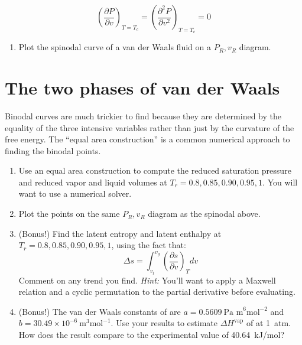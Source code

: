 \documentclass[11pt]{article}
\begin{document}
\begin{equation*}
  \left ( \frac{\partial P}{\partial v} \right )_{T=T_c} = \left (
    \frac{\partial^2 P}{\partial v^2} \right )_{T=T_c} = 0
\end{equation*}

\begin{enumerate}
\item Plot the spinodal curve of a van der Waals fluid on a \(P_R, v_R\) diagram.
\end{enumerate}

\section{The two phases of van der Waals}
\label{sec:orga764ce5}
Binodal curves are much trickier to find because they are determined by the equality of the three intensive variables rather than just by the curvature of the free energy.  The ``equal area construction'' is a common numerical approach to finding the binodal points.

\begin{enumerate}
\item Use an equal area construction to compute the reduced saturation pressure and
reduced vapor and liquid volumes at \(T_r = 0.8, 0.85, 0.90, 0.95, 1\).  You will want
to use a numerical solver.

\item Plot the points on the same \(P_R, v_R\) diagram as the spinodal above.

\item (Bonus!) Find the latent entropy and latent enthalpy at  \(T_r = 0.8, 0.85, 0.90, 0.95, 1\), using the fact that:
\begin{equation*}
  \Delta s = \int_{v_l}^{v_g} \left ( \frac{\partial s}{\partial v} \right )_T dv
\end{equation*}
Comment on any trend you find. \textit{Hint:} You'll want to apply a Maxwell relation and a cyclic permutation to the partial derivative before evaluating.

\item (Bonus!) The van der Waals constants of  are \(a = 0.5609~\text{Pa
      m}^6\text{mol}^{-2}\) and \(b = 30.49\times10^{-6}~\text{m}^3\text{mol}^{-1}\).  Use
your results to estimate \(\Delta H^\text{vap}\) of  at \SI{1}{atm}.  How does the result compare to the experimental value of \SI{40.64}{kJ/mol}?
\end{enumerate}
\end{document}
